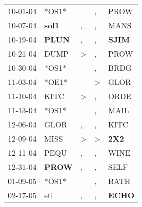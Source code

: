 \begin{supertabular}{p{0.07\textwidth}p{0.06\textwidth}p{0.02\textwidth}p{0.02\textwidth}p{0.06\textwidth}}
          10-01-04\textsuperscript{} &                            *OS1* &                  &                , &           PROW\textsuperscript{} \\
          10-07-04\textsuperscript{} &  \textbf{sol1\textsuperscript{}} &                , &                , &           MANS\textsuperscript{} \\
          10-19-04\textsuperscript{} &  \textbf{PLUN\textsuperscript{}} &                , &                , &  \textbf{SJIM\textsuperscript{}} \\
          10-21-04\textsuperscript{} &           DUMP\textsuperscript{} &     \textgreater &                , &           PROW\textsuperscript{} \\
          10-30-04\textsuperscript{} &                            *OS1* &                  &                , &           BRDG\textsuperscript{} \\
          11-03-04\textsuperscript{} &                            *OE1* &                  &     \textgreater &           GLOR\textsuperscript{} \\
          11-10-04\textsuperscript{} &           KITC\textsuperscript{} &     \textgreater &                , &           ORDE\textsuperscript{} \\
          11-13-04\textsuperscript{} &                            *OS1* &                  &                , &           MAIL\textsuperscript{} \\
          12-06-04\textsuperscript{} &           GLOR\textsuperscript{} &                , &                , &           KITC\textsuperscript{} \\
          12-09-04\textsuperscript{} &           MISS\textsuperscript{} &     \textgreater &     \textgreater &   \textbf{2X2\textsuperscript{}} \\
          12-11-04\textsuperscript{} &           PEQU\textsuperscript{} &                , &                , &           WINE\textsuperscript{} \\
          12-31-04\textsuperscript{} &  \textbf{PROW\textsuperscript{}} &                , &                , &           SELF\textsuperscript{} \\
          01-09-05\textsuperscript{} &                            *OS1* &                  &                , &           BATH\textsuperscript{} \\
          02-17-05\textsuperscript{} &            eti\textsuperscript{} &                , &                , &  \textbf{ECHO\textsuperscript{}} \\

\end{supertabular}
